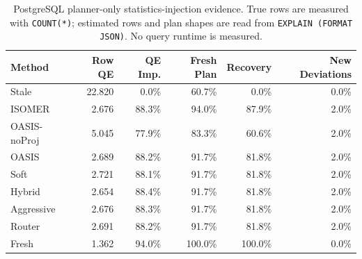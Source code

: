 \begin{table}[t]
  \centering
  \small
  \caption{PostgreSQL planner-only statistics-injection evidence. True rows are measured with \texttt{COUNT(*)}; estimated rows and plan shapes are read from \texttt{EXPLAIN (FORMAT JSON)}. No query runtime is measured.}
  \label{tab:postgres_planner_stats_injection}
  \setlength{\tabcolsep}{4pt}
  \begin{tabular}{lrrrrr}
    \toprule
    Method & Row QE & QE Imp. & Fresh Plan & Recovery & New Deviations \\
    \midrule
    Stale & 22.820 & 0.0\% & 60.7\% & 0.0\% & 0.0\% \\
    ISOMER & 2.676 & 88.3\% & 94.0\% & 87.9\% & 2.0\% \\
    OASIS-noProj & 5.045 & 77.9\% & 83.3\% & 60.6\% & 2.0\% \\
    OASIS & 2.689 & 88.2\% & 91.7\% & 81.8\% & 2.0\% \\
    Soft & 2.721 & 88.1\% & 91.7\% & 81.8\% & 2.0\% \\
    Hybrid & 2.654 & 88.4\% & 91.7\% & 81.8\% & 2.0\% \\
    Aggressive & 2.676 & 88.3\% & 91.7\% & 81.8\% & 2.0\% \\
    Router & 2.691 & 88.2\% & 91.7\% & 81.8\% & 2.0\% \\
    Fresh & 1.362 & 94.0\% & 100.0\% & 100.0\% & 0.0\% \\
    \bottomrule
  \end{tabular}
\end{table}
